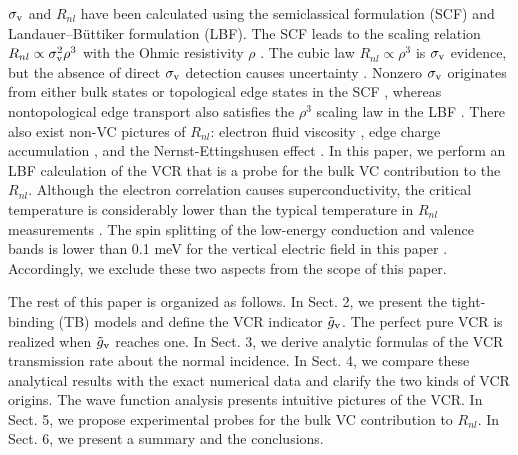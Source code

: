 \documentclass{jpsj3}
\begin{document}
$\sigma_{\rm v}$ and $R_{nl}$ have been calculated using the semiclassical formulation (SCF) \cite{(5)} and Landauer--B\"{u}ttiker formulation (LBF). 
\cite{2.,3.,4.,5.,6.,42.}
The SCF leads to the scaling relation $R_{nl} \propto \sigma_{\rm v}^2\rho^3$ with the Ohmic resistivity $\rho$ \cite{valley-review2,bilayer,(6)}.
The cubic law $R_{nl} \propto \rho^{3}$ is  $\sigma_{\rm v}$ evidence, 
but the absence of direct $\sigma_{\rm v}$ detection causes uncertainty \cite{5.,6.}.
Nonzero $\sigma_{\rm v}$ originates from
either bulk states \cite{s34.} or topological edge states in the SCF \cite{(2),(7)}, whereas nontopological edge transport also satisfies
the $\rho^{3}$ scaling law in the LBF \cite{Roche-1}.
There also exist non-VC pictures of $R_{nl}$:
electron fluid viscosity \cite{r25.,s13.,s37.,s39.}, edge charge accumulation \cite{8.}, and the Nernst-Ettingshusen effect \cite{s21.,s22.}. 
In this paper, we perform an LBF calculation of the VCR that is a probe for the bulk VC contribution to the $R_{nl}$. 
Although the electron correlation causes superconductivity, 
 the critical temperature is considerably lower
than the typical temperature  in $R_{nl}$ measurements \cite{(8),(9),(10)}.
The spin splitting 
of the low-energy conduction and valence bands is lower
than 0.1 meV for the vertical electric field
 in this paper \cite{a11.,a12.}.
Accordingly, we exclude these two aspects from the scope of this paper.




The rest of this  paper is organized as follows.
In Sect. 2, we present the tight-binding (TB) models and define
 the VCR indicator $\tilde{g}_{\rm v}$.
The perfect pure VCR is realized when $\tilde{g}_{\rm v}$ reaches one. 
In Sect. 3, we derive analytic formulas of
the VCR transmission rate about the normal incidence.
In Sect. 4, we  compare these analytical results with the exact numerical data and 
 clarify the two kinds of VCR origins. 
The wave function analysis presents intuitive pictures of the VCR.
In Sect. 5,  we propose experimental 
probes for the bulk VC contribution to  $R_{nl}$.
In Sect. 6, we present a summary and the conclusions.
\end{document}
